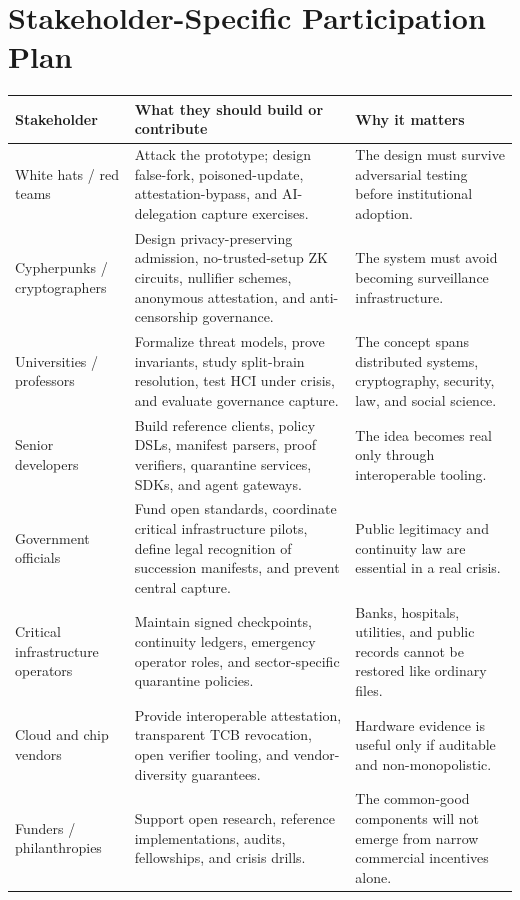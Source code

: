 \documentclass[11pt,letterpaper]{article}
\begin{document}
\section{Stakeholder-Specific Participation Plan}

\begin{longtable}{p{}p{}p{}}
\toprule
\textbf{Stakeholder} & \textbf{What they should build or contribute} & \textbf{Why it matters} \\
\midrule
White hats / red teams & Attack the prototype; design false-fork, poisoned-update, attestation-bypass, and AI-delegation capture exercises. & The design must survive adversarial testing before institutional adoption. \\
\addlinespace
Cypherpunks / cryptographers & Design privacy-preserving admission, no-trusted-setup ZK circuits, nullifier schemes, anonymous attestation, and anti-censorship governance. & The system must avoid becoming surveillance infrastructure. \\
\addlinespace
Universities / professors & Formalize threat models, prove invariants, study split-brain resolution, test HCI under crisis, and evaluate governance capture. & The concept spans distributed systems, cryptography, security, law, and social science. \\
\addlinespace
Senior developers & Build reference clients, policy DSLs, manifest parsers, proof verifiers, quarantine services, SDKs, and agent gateways. & The idea becomes real only through interoperable tooling. \\
\addlinespace
Government officials & Fund open standards, coordinate critical infrastructure pilots, define legal recognition of succession manifests, and prevent central capture. & Public legitimacy and continuity law are essential in a real crisis. \\
\addlinespace
Critical infrastructure operators & Maintain signed checkpoints, continuity ledgers, emergency operator roles, and sector-specific quarantine policies. & Banks, hospitals, utilities, and public records cannot be restored like ordinary files. \\
\addlinespace
Cloud and chip vendors & Provide interoperable attestation, transparent TCB revocation, open verifier tooling, and vendor-diversity guarantees. & Hardware evidence is useful only if auditable and non-monopolistic. \\
\addlinespace
Funders / philanthropies & Support open research, reference implementations, audits, fellowships, and crisis drills. & The common-good components will not emerge from narrow commercial incentives alone. \\
\bottomrule
\end{longtable}
\end{document}
